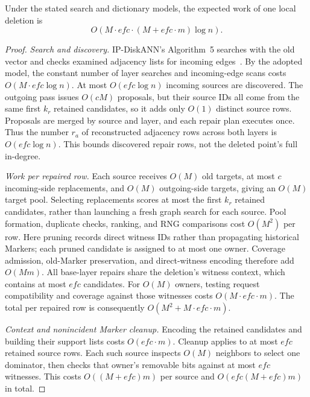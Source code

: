 \begin{lemma}
\label{le:deletion-cost}
Under the stated search and dictionary models, the expected work of one local deletion is
\begin{equation}
O\!\left(M \cdot efc \cdot (M+efc\cdot m)\log n\right).
\label{eq:app-deletion-local}
\end{equation}
\end{lemma}

\begin{proof}
\emph{Search and discovery.}
IP-DiskANN's Algorithm~5 searches with the old vector and checks examined adjacency lists for incoming edges~\cite{xu2025ipdiskann}.
By the adopted model, the constant number of layer searches and incoming-edge scans costs $O(M\cdot efc\log n)$.
At most $O(efc\log n)$ incoming sources are discovered.
The outgoing pass issues $O(cM)$ proposals, but their source IDs all come from the same first $k_r$ retained candidates, so it adds only $O(1)$ distinct source rows.
Proposals are merged by source and layer, and each repair plan executes once.
Thus the number $r_a$ of reconstructed adjacency rows across both layers is $O(efc\log n)$.
This bounds discovered repair rows, not the deleted point's full in-degree.

\emph{Work per repaired row.}
Each source receives $O(M)$ old targets, at most $c$ incoming-side replacements, and $O(M)$ outgoing-side targets, giving an $O(M)$ target pool.
Selecting replacements scores at most the first $k_r$ retained candidates, rather than launching a fresh graph search for each source.
Pool formation, duplicate checks, ranking, and RNG comparisons cost $O(M^2)$ per row.
Here pruning records direct witness IDs rather than propagating historical Markers; each pruned candidate is assigned to at most one owner.
Coverage admission, old-Marker preservation, and direct-witness encoding therefore add $O(Mm)$.
All base-layer repairs share the deletion's witness context, which contains at most $efc$ candidates.
For $O(M)$ owners, testing request compatibility and coverage against those witnesses costs $O(M\cdot efc\cdot m)$.
The total per repaired row is consequently $O(M^2+M\cdot efc\cdot m)$.

\emph{Context and nonincident Marker cleanup.}
Encoding the retained candidates and building their support lists costs $O(efc\cdot m)$.
Cleanup applies to at most $efc$ retained source rows.
Each such source inspects $O(M)$ neighbors to select one dominator, then checks that owner's removable bits against at most $efc$ witnesses.
This costs $O((M+efc)m)$ per source and $O(efc(M+efc)m)$ in total.


\end{proof}
